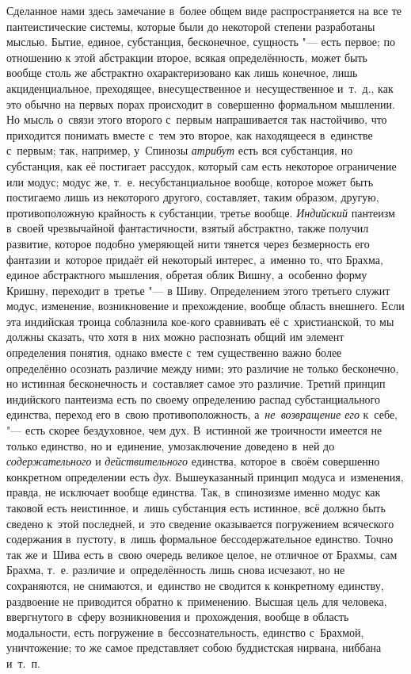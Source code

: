 Сделанное нами здесь замечание в~более общем виде распространяется на все те
пантеистические системы, которые были до некоторой степени разработаны мыслью.
Бытие, единое, субстанция, бесконечное, сущность "--- есть первое; по отношению
к этой абстракции второе, всякая определённость, может быть вообще столь же
абстрактно охарактеризовано как лишь конечное, лишь акциденциальное,
преходящее, внесущественное и~несущественное и~т.~д., как это обычно на первых
порах происходит в~совершенно формальном мышлении. Но мысль о~связи этого
второго с~первым напрашивается так настойчиво, что приходится понимать вместе
с~тем это второе, как находящееся в~единстве с~первым; так, например, у~Спинозы
{\em атрибут} есть вся субстанция, но субстанция, как её постигает рассудок,
который сам есть некоторое ограничение или модус; модус же, т.~е.
несубстанциальное вообще, которое может быть постигаемо лишь из некоторого
другого, составляет, таким образом, другую, противоположную крайность к
субстанции, третье вообще. {\em Индийский} пантеизм в~своей чрезвычайной
фантастичности, взятый абстрактно, также получил развитие, которое подобно
умеряющей нити тянется через безмерность его фантазии и~которое придаёт ей
некоторый интерес, а~именно то, что Брахма, единое абстрактного мышления,
обретая облик Вишну, а~особенно форму Кришну, переходит в~третье "---
в Шиву. Определением этого третьего служит модус, изменение, возникновение и
прехождение, вообще область внешнего. Если эта индийская троица соблазнила
кое-кого сравнивать её с~христианской, то мы должны сказать, что хотя в~них
можно распознать общий им элемент определения понятия, однако вместе с~тем
существенно важно более определённо осознать различие между ними; это различие
не только бесконечно, но истинная бесконечность и~составляет самое это
различие. Третий принцип индийского пантеизма есть по своему определению распад
субстанциального единства, переход его в~свою противоположность,
а~{\em не~возвращение его} к~себе, "--- есть скорее бездуховное, чем дух.
В~истинной же троичности имеется не только единство, но и~единение,
умозаключение доведено в~ней до {\em содержательного} и {\em действительного}
единства, которое в~своём совершенно конкретном определении есть {\em дух}.
Вышеуказанный принцип модуса и~изменения, правда, не исключает вообще единства.
Так, в~спинозизме именно модус как таковой есть неистинное, и~лишь субстанция
есть истинное, всё должно быть сведено к~этой последней, и~это сведение
оказывается погружением всяческого содержания в~пустоту, в~лишь формальное
бессодержательное единство. Точно так же и~Шива есть в~свою очередь великое
целое, не отличное от Брахмы, сам Брахма, т.~е. различие и~определённость лишь
снова исчезают, но не сохраняются, не снимаются, и~единство не сводится к
конкретному единству, раздвоение не приводится обратно к~применению. Высшая
цель для человека, ввергнутого в~сферу возникновения и~прохождения, вообще в
область модальности, есть погружение в~бессознательность, единство с~Брахмой,
уничтожение; то же самое представляет собою буддистская нирвана, ниббана
и~т.~п.

